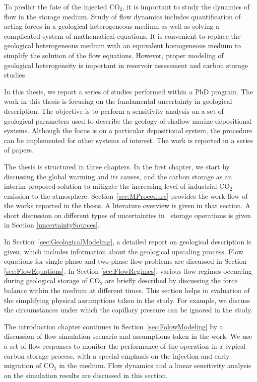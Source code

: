 To predict the fate of the injected $\mbox{CO}_2$, it is important to study the dynamics of flow in the storage medium. Study of flow dynamics includes quantification of acting forces in a geological heterogeneous medium as well as solving a
complicated system of mathematical equations. It is convenient to replace the
geological heterogeneous medium with an equivalent homogeneous medium to simplify the solution of the flow equations. However,
proper modeling of geological heterogeneity is important in reservoir
assessment and carbon storage studies
\cite{eaton2006importance,bashore1993importance,melick2009incorporating,
milliken2008effect}.

In this thesis, we report a series of studies performed within a PhD program. The work in this thesis is focusing on the fundamental uncertainty in geological
description. The objective is to perform a sensitivity analysis on a set of geological parameters used to describe the geology of
shallow-marine depositional systems. Although the focus is on a particular
depositional system, the procedure can be implemented for other systems of
interest. The work is reported in a series of papers.

The thesis is structured in three chapters. In the first chapter, we start by discussing the global warming and its
causes, and the carbon storage as an interim proposed solution to mitigate the
increasing level of industrial $\mbox{CO}_2$ emission to the atmosphere.
Section~\ref{sec:MProcedure} provides the work-flow of the works reported in the
thesis. A literature overview is given in
that section. A short discussion on different types of uncertainties in \coo\ storage operations is given in Section \ref{uncertaintySources}.

In Section~\ref{sec:GeologicalModeling}, a detailed report on geological description is given, which includes information about the geological upscaling process. Flow equations for single-phase and two-phase flow
problems are discussed in Section \ref{sec:FlowEquations}. In Section
\ref{sec:FlowRegimes}, various flow regimes occurring during geological storage
of $\mbox{CO}_2$ are briefly described by discussing the force balance within
the medium at different times. This section helps in evaluation of the simplifying physical assumptions taken in the study. For example, we discuss the circumstances under which the capillary pressure can be ignored in the study. 

The introduction chapter continues in Section~\ref{sec:FolowModeling} by a discussion of flow simulation scenario and assumptions taken in the work. We use a set of flow responses to monitor the performance of the operation in a typical carbon storage process, with a special emphasis on the injection and early migration of $\mbox{CO}_2$ in the medium. Flow dynamics and a linear sensitivity analysis on the simulation results are discussed in this section. 

